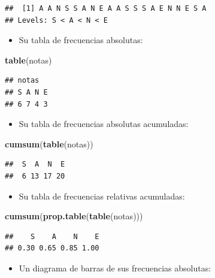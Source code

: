 \documentclass[]{book}
\newenvironment{Shaded}{\begin{snugshade}}{\end{snugshade}}
\newcommand{\KeywordTok}[1]{\textcolor[rgb]{0.13,0.29,0.53}{\textbf{#1}}}
\newcommand{\NormalTok}[1]{#1}
\providecommand{\tightlist}{%
  \setlength{\itemsep}{0pt}\setlength{\parskip}{0pt}}
\theoremstyle{definition}
\theoremstyle{definition}
\theoremstyle{definition}
\theoremstyle{remark}
\begin{document}
\begin{verbatim}
##  [1] A A N S S A N E A A S S S A E N N E S A
## Levels: S < A < N < E
\end{verbatim}

\begin{itemize}
\tightlist
\item
  Su tabla de frecuencias absolutas:
\end{itemize}

\begin{Shaded}
\begin{Highlighting}[]
\KeywordTok{table}\NormalTok{(notas)}
\end{Highlighting}
\end{Shaded}

\begin{verbatim}
## notas
## S A N E 
## 6 7 4 3
\end{verbatim}

\begin{itemize}
\tightlist
\item
  Su tabla de frecuencias absolutas acumuladas:
\end{itemize}

\begin{Shaded}
\begin{Highlighting}[]
\KeywordTok{cumsum}\NormalTok{(}\KeywordTok{table}\NormalTok{(notas))}
\end{Highlighting}
\end{Shaded}

\begin{verbatim}
##  S  A  N  E 
##  6 13 17 20
\end{verbatim}

\begin{itemize}
\tightlist
\item
  Su tabla de frecuencias relativas acumuladas:
\end{itemize}

\begin{Shaded}
\begin{Highlighting}[]
\KeywordTok{cumsum}\NormalTok{(}\KeywordTok{prop.table}\NormalTok{(}\KeywordTok{table}\NormalTok{(notas)))}
\end{Highlighting}
\end{Shaded}

\begin{verbatim}
##    S    A    N    E 
## 0.30 0.65 0.85 1.00
\end{verbatim}

\begin{itemize}
\tightlist
\item
  Un diagrama de barras de sus frecuencias absolutas:
\end{itemize}
\end{document}
